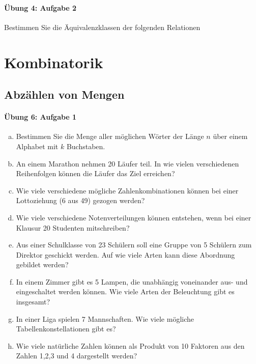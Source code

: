 \documentclass
[
  draft    = true,
  fontsize = 11pt,
  parskip  = half-,
  BCOR     = 0pt,
  DIV      = 11,
  ngerman,
  dvipsnames
]
{scrartcl}
\begin{document}
\paragraph{Übung 4: Aufgabe 2}
Bestimmen Sie die Äquivalenzklassen der folgenden Relationen

\section{Kombinatorik}

\subsection{Abzählen von Mengen}

\paragraph{Übung 6: Aufgabe 1}
\begin{enumerate}[a)]
  \item Bestimmen Sie die Menge aller möglichen Wörter der Länge $n$ über einem Alphabet mit $k$ Buchstaben.
  \item An einem Marathon nehmen 20 Läufer teil. In wie vielen verschiedenen Reihenfolgen können die Läufer das Ziel erreichen?
  \item Wie viele verschiedene mögliche Zahlenkombinationen können bei einer Lottoziehung (6 aus 49) gezogen werden?
  \item Wie viele verschiedene Notenverteilungen können entstehen, wenn bei einer Klausur 20 Studenten mitschreiben?
  \item Aus einer Schulklasse von 23 Schülern soll eine Gruppe von 5 Schülern zum Direktor geschickt werden. Auf wie viele Arten kann diese Abordnung gebildet werden?
  \item In einem Zimmer gibt es 5 Lampen, die unabhängig voneinander aus- und eingeschaltet werden können. Wie viele Arten der Beleuchtung gibt es insgesamt?
  \item In einer Liga spielen 7 Mannschaften. Wie viele mögliche Tabellenkonstellationen gibt es?
  \item Wie viele natürliche Zahlen können als Produkt von 10 Faktoren aus den Zahlen 1,2,3 und 4 dargestellt werden?
\end{enumerate}
\end{document}
